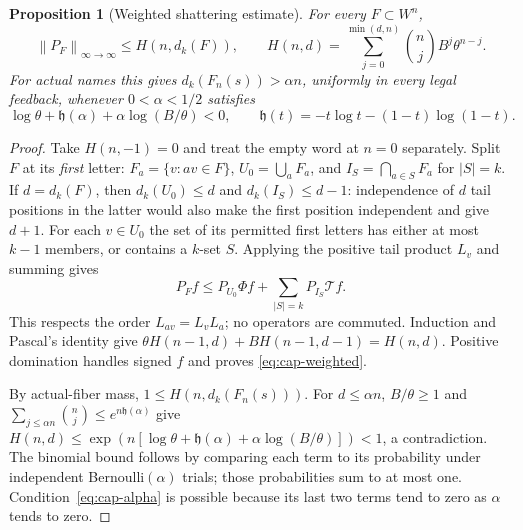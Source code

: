 \documentclass[11pt,reqno]{amsart}
\numberwithin{equation}{section}
\newtheorem{proposition}[theorem]{Proposition}
\theoremstyle{definition}
\newcommand{\opnorm}[1]{\left\|#1\right\|_{\infty\to\infty}}
\begin{document}
\begin{proposition}[Weighted shattering estimate]\label{prop:weighted-sauer}
For every $F\subset W^n$,
\begin{equation}\label{eq:cap-weighted}
 \opnorm{P_F}\le
 H(n,d_k(F)),\qquad
 H(n,d)=\sum_{j=0}^{\min(d,n)}\binom nj B^j\theta^{n-j}.
\end{equation}
For actual names this gives $d_k(F_n(s))>\alpha n$, uniformly in
every legal feedback, whenever $0<\alpha<1/2$ satisfies
\begin{equation}\label{eq:cap-alpha}
 \log\theta+\mathfrak h(\alpha)+\alpha\log(B/\theta)<0,
 \qquad\mathfrak h(t)=-t\log t-(1-t)\log(1-t).
\end{equation}
\end{proposition}
\begin{proof}
Take $H(n,-1)=0$ and treat the empty word at $n=0$ separately.
Split $F$ at its \emph{first} letter: $F_a=\{v:av\in F\}$,
$U_0=\bigcup_aF_a$, and $I_S=\bigcap_{a\in S}F_a$ for
$|S|=k$. If $d=d_k(F)$, then $d_k(U_0)\le d$ and
$d_k(I_S)\le d-1$: independence of $d$ tail positions in the latter
would also make the first position independent and give $d+1$.
For each $v\in U_0$ the set of its permitted first letters has
either at most $k-1$ members, or contains a $k$-set $S$. Applying
the positive tail product $L_v$ and summing gives
\[
 P_F f\le P_{U_0}\Phi f+\sum_{|S|=k}P_{I_S}\mathcal T f.
\]
This respects the order $L_{av}=L_vL_a$; no operators are
commuted. Induction and Pascal's identity give
$\theta H(n-1,d)+BH(n-1,d-1)=H(n,d)$. Positive domination
handles signed $f$ and proves \eqref{eq:cap-weighted}.

By actual-fiber mass, $1\le H(n,d_k(F_n(s)))$.
For $d\le\alpha n$, $B/\theta\ge1$ and
$\sum_{j\le\alpha n}\binom nj\le e^{n\mathfrak h(\alpha)}$
give
$H(n,d)\le\exp(n[\log\theta+\mathfrak h(\alpha)+
\alpha\log(B/\theta)])<1$, a contradiction.
The binomial bound follows by comparing each term to its probability
under independent Bernoulli$(\alpha)$ trials; those probabilities
sum to at most one. Condition~\eqref{eq:cap-alpha} is possible
because its last two terms tend to zero as $\alpha$ tends to zero.
\end{proof}
\end{document}
